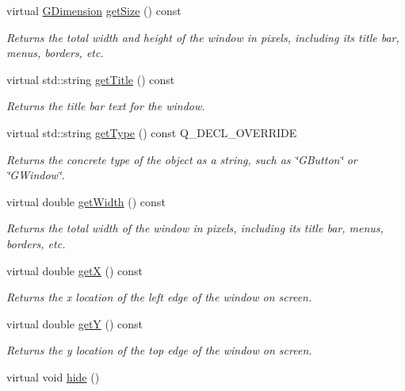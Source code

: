 \begin{DoxyCompactItemize}
virtual \mbox{\hyperlink{classGDimension}{G\+Dimension}} \mbox{\hyperlink{classGWindow_a7b4eec96a2bdc6420695d5796a78eea9}{get\+Size}} () const
\begin{DoxyCompactList}\small\item\em Returns the total width and height of the window in pixels, including its title bar, menus, borders, etc. \end{DoxyCompactList}\item 
virtual std\+::string \mbox{\hyperlink{classGWindow_abc7651e67987c4682fed77d92a860bba}{get\+Title}} () const
\begin{DoxyCompactList}\small\item\em Returns the title bar text for the window. \end{DoxyCompactList}\item 
virtual std\+::string \mbox{\hyperlink{classGWindow_a9896d58fcfebbf1025aeeb5b8b9ede80}{get\+Type}} () const Q\+\_\+\+D\+E\+C\+L\+\_\+\+O\+V\+E\+R\+R\+I\+DE
\begin{DoxyCompactList}\small\item\em Returns the concrete type of the object as a string, such as {\ttfamily \char`\"{}\+G\+Button\char`\"{}} or {\ttfamily \char`\"{}\+G\+Window\char`\"{}}. \end{DoxyCompactList}\item 
virtual double \mbox{\hyperlink{classGWindow_a0ed2965abd4f5701d2cadf71239faf19}{get\+Width}} () const
\begin{DoxyCompactList}\small\item\em Returns the total width of the window in pixels, including its title bar, menus, borders, etc. \end{DoxyCompactList}\item 
virtual double \mbox{\hyperlink{classGWindow_a344385751bee0720059403940d57a13e}{getX}} () const
\begin{DoxyCompactList}\small\item\em Returns the x location of the left edge of the window on screen. \end{DoxyCompactList}\item 
virtual double \mbox{\hyperlink{classGWindow_aafa51c7f8f38a09febbb9ce7853f77b4}{getY}} () const
\begin{DoxyCompactList}\small\item\em Returns the y location of the top edge of the window on screen. \end{DoxyCompactList}\item 
virtual void \mbox{\hyperlink{classGWindow_ade42eb4da4eb77db85a8d1e4b92e7be4}{hide}} ()

\end{DoxyCompactItemize}
